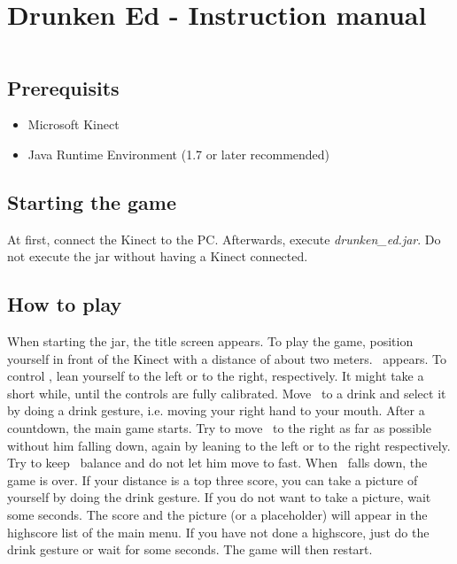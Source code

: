 \documentclass{article}
\begin{document}
\section*{Drunken Ed - Instruction manual}

$ $\\

\subsection*{Prerequisits}

\begin{itemize}
\item Microsoft Kinect
\item Java Runtime Environment (1.7 or later recommended)
\end{itemize}

\subsection*{Starting the game}

At first, connect the Kinect to the PC. Afterwards, execute \textit{drunken\_ed.jar}. Do not execute the jar without having a Kinect connected.

\subsection*{How to play}

When starting the jar, the title screen appears. To play the game, position yourself in front of the Kinect with a distance of about two meters. \ed\ appears. To control \ed, lean yourself to the left or to the right, respectively. It might take a short while, until the controls are fully calibrated. Move \ed\ to a drink and select it by doing a drink gesture, i.e. moving your right hand to your mouth. After a countdown, the main game starts. Try to move \ed\ to the right as far as possible without him falling down, again by leaning to the left or to the right respectively. Try to keep \eds\ balance and do not let him move to fast. When \ed\ falls down, the game is over. If your distance is a top three score, you can take a picture of yourself by doing the drink gesture. If you do not want to take a picture, wait some seconds. The score and the picture (or a placeholder) will appear in the highscore list of the main menu. If you have not done a highscore, just do the drink gesture or wait for some seconds. The game will then restart.
\end{document}
